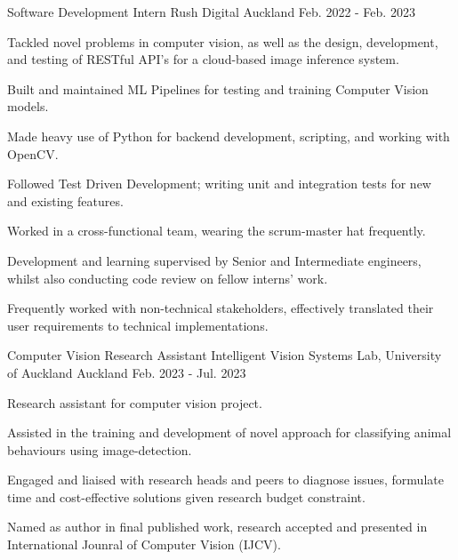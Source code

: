 

\begin{cventries}

  \cventry
    {Software Development Intern} %
    {Rush Digital} %
    {Auckland} %
    {Feb. 2022 - Feb. 2023} %
    {
      \begin{cvitems} %
      \item {Tackled novel problems in computer vision, as well as the design, development, and testing of RESTful API's for a cloud-based image inference system.}
      \item {Built and maintained ML Pipelines for testing and training Computer Vision models.}
      \item {Made heavy use of Python for backend development, scripting, and working with OpenCV.}
        \item {Followed Test Driven Development; writing unit and integration tests for new and existing features.}
        \item {Worked in a cross-functional team, wearing the scrum-master hat frequently.}
        \item {Development and learning supervised by Senior and Intermediate engineers, whilst also conducting code review on fellow interns' work.}
        \item {Frequently worked with non-technical stakeholders, effectively translated their user requirements to technical implementations.}
      \end{cvitems}
    }

  \cventry
    {Computer Vision Research Assistant} %
    {Intelligent Vision Systems Lab, University of Auckland} %
    {Auckland} %
    {Feb. 2023 - Jul. 2023} %
    {
      \begin{cvitems} %
        \item {Research assistant for computer vision project.}
        \item {Assisted in the training and development of novel approach for classifying animal behaviours using image-detection.}
        \item {Engaged and liaised with research heads and peers to diagnose issues, formulate time and cost-effective solutions given research budget constraint.}
        \item {Named as author in final published work, research accepted and presented in International Jounral of Computer Vision (IJCV).}
      \end{cvitems}
    }


    
\end{cventries}
